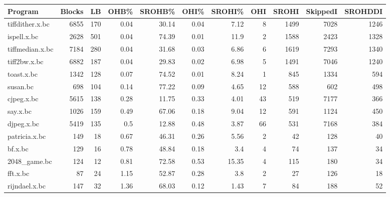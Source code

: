 \begin{tabular}{l|r|r|r|r|r|r|r|r|r|r|}
\hline
 Program              &   Blocks &   LB &   OHB\% &   SROHB\% &   OHI\% &   SROHI\% &   OHI &   SROHI &   SkippedI &   SROHDDI \\
\hline
 tiffdither.x.bc      &     6855 &  170 &   0.04 &    30.14 &   0.04 &     7.12 &     8 &    1499 &       7028 &      1246 \\
\hline
 ispell.x.bc          &     2628 &  501 &   0.04 &    74.39 &   0.01 &    11.9  &     2 &    1588 &       2423 &      1328 \\
\hline
 tiffmedian.x.bc      &     7184 &  280 &   0.04 &    31.68 &   0.03 &     6.86 &     6 &    1619 &       7293 &      1340 \\
\hline
 tiff2bw.x.bc         &     6882 &  187 &   0.04 &    29.83 &   0.02 &     6.98 &     5 &    1491 &       7046 &      1240 \\
\hline
 toast.x.bc           &     1342 &  128 &   0.07 &    74.52 &   0.01 &     8.24 &     1 &     845 &       1334 &       594 \\
\hline
 susan.bc             &      698 &  104 &   0.14 &    77.22 &   0.09 &     4.65 &    12 &     588 &        602 &       498 \\
\hline
 cjpeg.x.bc           &     5615 &  138 &   0.28 &    11.75 &   0.33 &     4.01 &    43 &     519 &       7177 &       366 \\
\hline
 say.x.bc             &     1026 &  159 &   0.49 &    67.06 &   0.18 &     9.04 &    12 &     591 &       1124 &       450 \\
\hline
 djpeg.x.bc           &     5419 &  135 &   0.5  &    12.88 &   0.48 &     3.87 &    66 &     531 &       7168 &       384 \\
\hline
 patricia.x.bc        &      149 &   18 &   0.67 &    46.31 &   0.26 &     5.56 &     2 &      42 &        128 &        40 \\
\hline
 bf.x.bc              &      129 &   16 &   0.78 &    48.84 &   0.18 &     3.4  &     4 &      74 &        137 &        34 \\
\hline
 2048\_game.bc         &      124 &   12 &   0.81 &    72.58 &   0.53 &    15.35 &     4 &     115 &        180 &        34 \\
\hline
 fft.x.bc             &       87 &   24 &   1.15 &    52.87 &   0.28 &     3.8  &     2 &      27 &        126 &        18 \\
\hline
 rijndael.x.bc        &      147 &   32 &   1.36 &    68.03 &   0.12 &     1.43 &     7 &      84 &        188 &        52 \\

\end{tabular}
